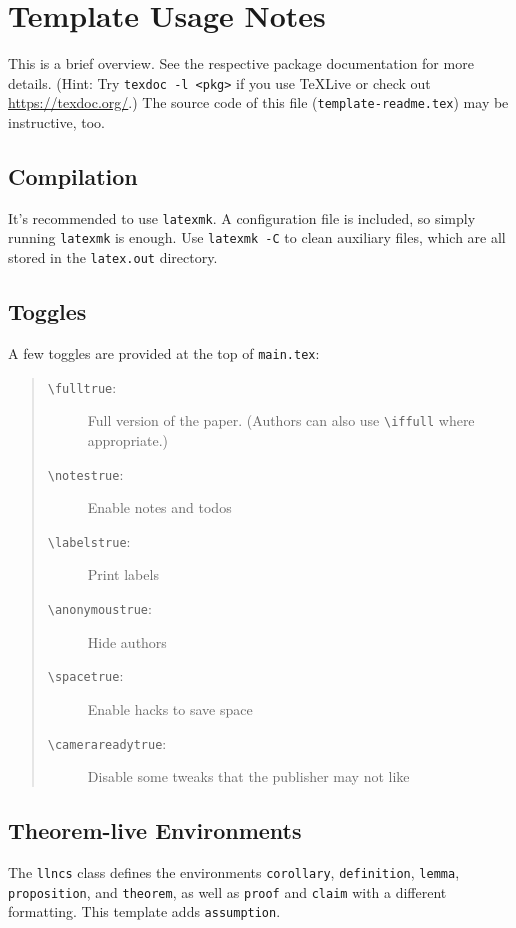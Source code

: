 \setcounter{section}{-1}
\section{Template Usage Notes}
This is a brief overview.
See the respective package documentation for more details. (Hint: Try \texttt{texdoc -l <pkg>} if you use TeXLive or check out \url{https://texdoc.org/}.)
The source code of this file (\texttt{template-readme.tex}) may be instructive, too.


\subsection{Compilation}
It's recommended to use \texttt{latexmk}.
A configuration file is included, so simply running \texttt{latexmk} is enough.
Use \texttt{latexmk -C} to clean auxiliary files, which are all stored in the \texttt{latex.out} directory.


\subsection{Toggles}
A few toggles are provided at the top of \texttt{main.tex}:
\begin{quote}
  \begin{description}
    \item [\texttt{\textbackslash{}fulltrue}:]
          Full version of the paper. (Authors can also use \verb|\iffull| where appropriate.)
    \item [\texttt{\textbackslash{}notestrue}:]
          Enable notes and todos
    \item [\texttt{\textbackslash{}labelstrue}:]
          Print labels
    \item [\texttt{\textbackslash{}anonymoustrue}:]
          Hide authors
    \item [\texttt{\textbackslash{}spacetrue}:]
          Enable hacks to save space
    \item [\texttt{\textbackslash{}camerareadytrue}:]
          Disable some tweaks that the publisher may not like
  \end{description}
\end{quote}


\subsection{Theorem-live Environments}
The \texttt{llncs} class defines the environments
\texttt{corollary}, \texttt{definition}, \texttt{lemma}, \texttt{proposition}, and \texttt{theorem},
as well as \texttt{proof} and \texttt{claim} with a different formatting.
This template adds \texttt{assumption}.

